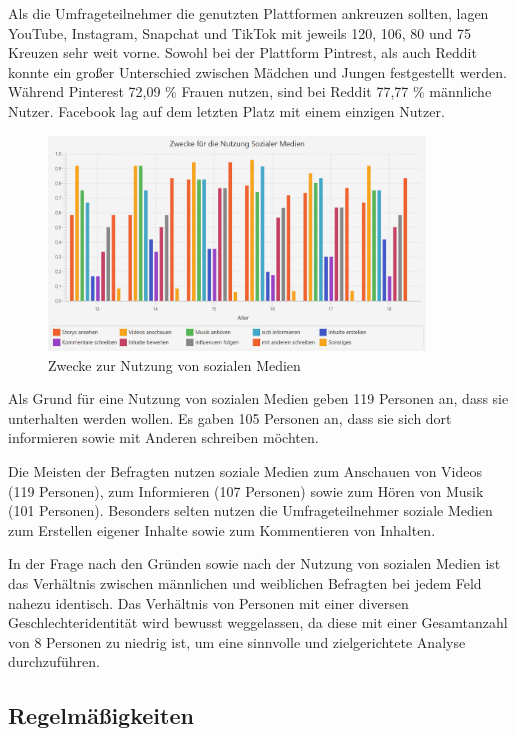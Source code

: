 Als die Umfrageteilnehmer die genutzten Plattformen ankreuzen sollten, lagen YouTube, Instagram, Snapchat und TikTok mit jeweils 120, 106, 80 und 75 Kreuzen sehr weit vorne. Sowohl bei der Plattform Pintrest, als auch Reddit konnte ein großer Unterschied zwischen Mädchen und Jungen festgestellt werden. Während Pinterest 72,09 \% Frauen nutzen, sind bei Reddit 77,77 \% männliche Nutzer. Facebook lag auf dem letzten Platz mit einem einzigen Nutzer.

\begin{figure}[ht]
    \centering
    \includegraphics[width=10cm]{image/Diagramm Zwecke der Nutzung.png}
    \caption{\label{imgs:diagramm_zwecke_datenwerte}Zwecke zur Nutzung von sozialen Medien}
\end{figure}

Als Grund für eine Nutzung von sozialen Medien geben 119 Personen an, dass sie unterhalten werden wollen. Es gaben 105 Personen an, dass sie sich dort informieren sowie mit Anderen schreiben möchten.

Die Meisten der Befragten nutzen soziale Medien zum Anschauen von Videos (119 Personen), zum Informieren (107 Personen) sowie zum Hören von Musik (101 Personen). Besonders selten nutzen die Umfrageteilnehmer soziale Medien zum Erstellen eigener Inhalte sowie zum Kommentieren von Inhalten.

In der Frage nach den Gründen sowie nach der Nutzung von sozialen Medien ist das Verhältnis zwischen männlichen und weiblichen Befragten bei jedem Feld nahezu identisch. Das Verhältnis von Personen mit einer diversen Geschlechteridentität wird bewusst weggelassen, da diese mit einer Gesamtanzahl von 8 Personen zu niedrig ist, um eine sinnvolle und zielgerichtete Analyse durchzuführen.

\subsection{Regelmäßigkeiten}


